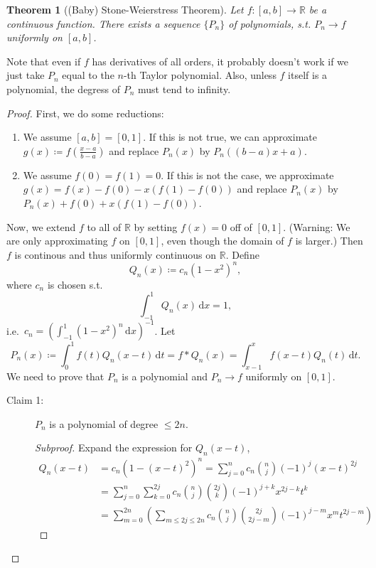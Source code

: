 \documentclass[12pt]{article}
\theoremstyle{plain}
\newtheorem{thm}{Theorem}
\theoremstyle{definition}
\begin{document}
\begin{thm}[(Baby) Stone-Weierstress Theorem]
    Let $f:[a,b]\rightarrow\mathbb{R}$ be a continuous function.
    There exists a sequence $\{P_n\}$ of polynomials, s.t. $P_n\rightarrow f$
    uniformly on $[a,b]$.
\end{thm}
    Note that even if $f$ has derivatives of all orders, it probably doesn't work if we
    just take $P_n$ equal to the $n$-th Taylor polynomial.
    Also, unless $f$ itself is a polynomial, the degress of $P_n$ must tend to
    infinity.
\begin{proof}
    First, we do some reductions:
    \begin{enumerate}
        \item We assume $[a,b]=[0,1]$.
        If this is not true, we can approximate $g(x)\coloneqq
        f(\frac{x-a}{b-a})$ and replace $P_n(x)$ by $P_n((b-a)x+a)$.
        \item We assume $f(0)=f(1)=0$.
        If this is not the case, we approximate $g(x)=f(x)-f(0)-x(f(1)-f(0))$
        and replace $P_n(x)$ by $P_n(x)+f(0)+x(f(1)-f(0))$.
    \end{enumerate}
    Now, we extend $f$ to all of $\mathbb{R}$ by setting $f(x)=0$ off of $[0,1]$.
    (Warning: We are only approximating $f$ on $[0,1]$, even though the domain
    of $f$ is larger.)
    Then $f$ is continous and thus uniformly continuous on $\mathbb{R}$.
    Define $$Q_n(x)\coloneqq c_n(1-x^2)^n,$$ where $c_n$ is chosen s.t.
    $$\int_{-1}^1Q_n(x)\,\mathrm{d}x=1,$$
    i.e.\  $c_n=\left(\int_{-1}^1(1-x^2)^n\,\mathrm{d}x\right)^{-1}$.
    Let 
    $$P_n(x)\coloneqq\int_0^1f(t)Q_n(x-t)\,\mathrm{d}t=f*Q_n(x)
    =\int_{x-1}^xf(x-t)Q_n(t)\,\mathrm{d}t.$$
    We need to prove that $P_n$ is a polynomial and $P_n\rightarrow f$
    uniformly on $[0,1]$.
    \begin{description}
        \item[Claim 1:] $P_n$ is a polynomial of degree $\leq2n$.
        \begin{proof}[Subproof]
            Expand the expression for $Q_n(x-t)$, 
            $$\begin{aligned}
            Q_n(x-t)&=c_n(1-(x-t)^2)^n=\sum_{j=0}^nc_n\binom{n}{j}(-1)^j(x-t)^{2j}\\
            &=\sum_{j=0}^n\sum_{k=0}^{2j}c_n \binom{n}{j}\binom{2j}{k}(-1)^{j+k}x^{2j-k}t^k\\
            &=\sum_{m=0}^{2n}\left(\sum_{m\leq 2j\leq 2n}c_n\binom{n}{j}
            \binom{2j}{2j-m}(-1)^{j-m}x^mt^{2j-m}\right)

\end{aligned}$$
\end{proof}
\end{description}
\end{proof}
\end{document}
